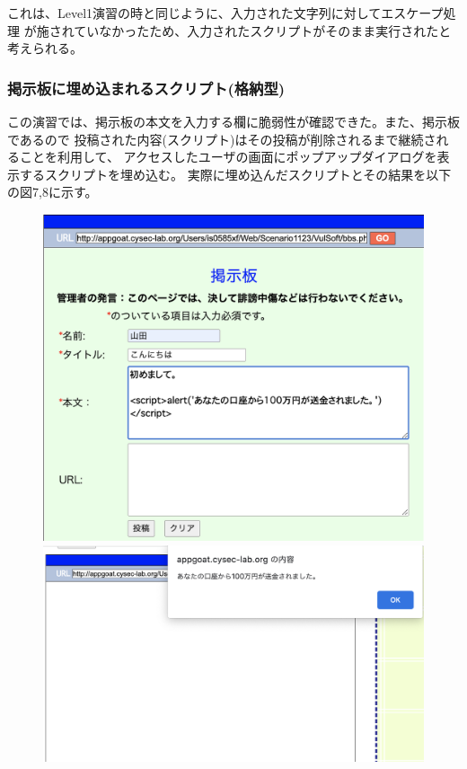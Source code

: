 \documentclass[dvipdfmx,autodetect-engine,titlepage]{jsarticle}
\begin{document}
これは、Level1演習の時と同じように、入力された文字列に対してエスケープ処理
が施されていなかったため、入力されたスクリプトがそのまま実行されたと考えられる。

\subsubsection*{掲示板に埋め込まれるスクリプト(格納型)}
この演習では、掲示板の本文を入力する欄に脆弱性が確認できた。また、掲示板であるので
投稿された内容(スクリプト)はその投稿が削除されるまで継続されることを利用して、
アクセスしたユーザの画面にポップアップダイアログを表示するスクリプトを埋め込む。
実際に埋め込んだスクリプトとその結果を以下の図7,8に示す。 \\

\begin{figure}[h]
  \centering
  \begin{minipage}[b]{0.45\linewidth}
  \begin{center}
    \includegraphics[keepaspectratio,scale=0.3]{pic7.png}
    \end{center}
    \caption{}
  \end{minipage}
  \begin{minipage}[b]{0.45\linewidth}
  \begin{center}
    \includegraphics[keepaspectratio,scale=0.3]{pic8.png}
    \end{center}
    \caption{}
  \end{minipage}
\end{figure}
\end{document}

